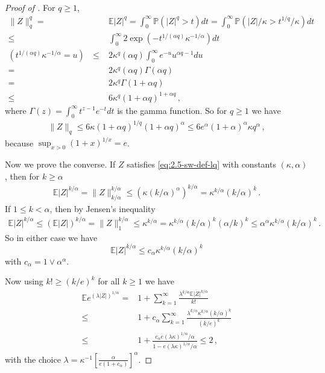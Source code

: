 \documentclass[11pt]{article}
\theoremstyle{plain}
\begin{document}
\begin{proof}[Proof of ]
For $q\ge 1$,
\begin{align*}
\|Z\|_q^q = & \mathbb E |Z|^q =\int_0^\infty \mathbb P(|Z|^q>t)dt = \int_0^\infty \mathbb P(|Z|/\kappa>t^{1/q}/\kappa)dt\\
\le & \int_0^\infty 2\exp\left(-t^{1/(\alpha q)}\kappa^{-1/\alpha}\right)dt\\
(t^{1/(\alpha q)}\kappa^{-1/\alpha}=u)~~~\le & 2\kappa^q(\alpha q)\int_0^\infty e^{-u} u^{\alpha q-1}du\\
=& 2\kappa^q(\alpha q)\Gamma(\alpha q)\\
=&2\kappa^q\Gamma(1+\alpha q)\\
\le & 6\kappa^q (1+\alpha q)^{1+\alpha q}\,,
\end{align*}
where $\Gamma(z)=\int_0^\infty t^{z-1}e^{-t}dt$ is the gamma function.
So for $q\ge 1$ we have
\begin{align*}
    \|Z\|_q \le 6 \kappa(1+\alpha q)^{1/q}(1+\alpha q)^\alpha \le 6 e^\alpha (1+\alpha)^\alpha \kappa q^\alpha\,,
\end{align*}
because $\sup_{x>0}(1+x)^{1/x}=e$.

Now we prove the converse. If $Z$ satisfies \eqref{eq:2.5-sw-def-lq} with constants $(\kappa,\alpha)$, then for $k\ge \alpha$
\begin{align*}
    \mathbb E |Z|^{k/\alpha} =\|Z\|_{k/\alpha}^{k/\alpha}\le \left( \kappa(k/\alpha)^\alpha\right)^{k/\alpha}= \kappa^{k/\alpha}(k/\alpha)^k\,.
\end{align*}
If $1\le k<\alpha$, then by Jensen's inequality
\begin{align*}
    \mathbb E |Z|^{k/\alpha} \le \left(\mathbb E |Z|\right)^{k/\alpha}= \|Z\|_1^{k/\alpha}\le \kappa^{k/\alpha}=\kappa^{k/\alpha}(k/\alpha)^k (\alpha/k)^k\le \alpha^\alpha\kappa^{k/\alpha}(k/\alpha)^k\,.
\end{align*}
So in either case we have
$$\mathbb E |Z|^{k/\alpha}\le c_\alpha\kappa^{k/\alpha}(k/\alpha)^k$$
with $c_\alpha = 1\vee \alpha^\alpha$.

Now using $k!\ge (k/e)^k$ for all $k\ge 1$ we have
\begin{align*}
    \mathbb E e^{(\lambda|Z|)^{1/\alpha}} = & 1+\sum_{k=1}^\infty \frac{\lambda^{k/\alpha} \mathbb E|Z|^{k/\alpha}}{k!}\\
    \le & 1+c_\alpha\sum_{k=1}^\infty\frac{\lambda^{k/\alpha} \kappa^{k/\alpha} (k/\alpha)^k}{(k/e)^k}\\
     \le & 1+\frac{c_\alpha e(\lambda \kappa)^{1/\alpha}/\alpha}{1-e(\lambda \kappa)^{1/\alpha}/\alpha}
     \le 2\,,
\end{align*}
with the choice $\lambda =\kappa^{-1}\left[\frac{\alpha}{e(1+c_\alpha)}\right]^\alpha$.


\end{proof}
\end{document}
